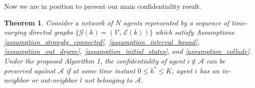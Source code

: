 \documentclass{IEEEtran}
\newtheorem{Theorem}{Theorem}
\begin{document}
Now we are in position to present our main confidentiality result.

\begin{Theorem}\label{theorem_preserve_privacy}
	Consider a network of $N$ agents represented by a sequence of time-varying directed graphs $\{\mathcal{G}(k)=(\mathcal{V}, \, \mathcal{E}(k))\}$ which satisfy Assumptions \ref{assumption_strongly_connected}, \ref{assumption_interval_bound}, \ref{assumption_out_degree}, \ref{assumption_initial_states}, and \ref{assumption_collude}. Under the proposed Algorithm 1, the confidentiality of agent $i\notin \mathcal{A}$ can be preserved against $\mathcal{A}$ if at some time instant $0\leq k^* \leq K$, agent $i$ has an in-neighbor or out-neighbor $l$ not belonging to $\mathcal{A}$.
\end{Theorem}
\end{document}
